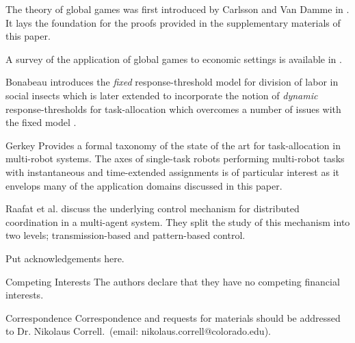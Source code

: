 \documentclass{nature}
\begin{document}



The theory of global games was first introduced by Carlsson and Van Damme in \cite{Carlsson1993}. It lays the foundation for the proofs provided in the supplementary materials of this paper.

A survey of the application of global games to economic settings is available in \cite{Morris2000}.

Bonabeau \cite{Bonabeau1996} introduces the \emph{fixed} response-threshold model for division of labor in social insects which is later extended to incorporate the notion of \emph{dynamic} response-thresholds for task-allocation which overcomes a number of issues with the fixed model \cite{Theraulaz1998}.

\cite{Martinoli1999}

\cite{Bonabeau2000}

\cite{Krieger2000}

\cite{Kube2000}

\cite{Pynadath2002}

\cite{Conradt2003}

\cite{Mataric2003}

\cite{Gerkey2003}

Gerkey \cite{Gerkey2004} Provides a formal taxonomy of the state of the art for task-allocation in multi-robot systems. The axes of single-task robots performing multi-robot tasks with instantaneous and time-extended assignments is of particular interest as it envelops many of the application domains discussed in this paper.

\cite{Conradt2005}

Raafat et al. \cite{Raafat2009} discuss the underlying control mechanism for distributed coordination in a multi-agent system. They split the study of this mechanism into two levels; transmission-based and pattern-based control. 

\cite{Yoshida2010}

\cite{Suzuki2015}






\begin{addendum}
 \item Put acknowledgements here.
 \item[Competing Interests] The authors declare that they have no
competing financial interests.
 \item[Correspondence] Correspondence and requests for materials
should be addressed to Dr. Nikolaus Correll.~(email: nikolaus.correll@colorado.edu).
\end{addendum}

\end{document}
